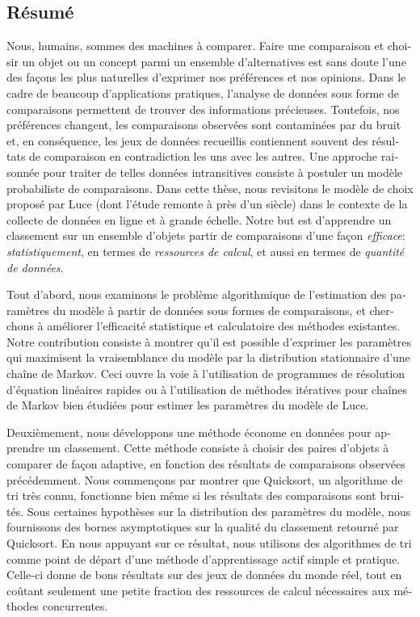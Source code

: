 \begin{otherlanguage}{french}
\chapter*{Résumé}

Nous, humains, sommes des machines à comparer.
Faire une comparaison et choisir un objet ou un concept parmi un ensemble d'alternatives est sans doute l'une des façons les plus naturelles d'exprimer nos préférences et nos opinions.
Dans le cadre de beaucoup d'applications pratiques, l'analyse de données sous forme de comparaisons permettent de trouver des informations précieuses.
Toutefois, nos préférences changent, les comparaisons observées sont contaminées par du bruit et, en conséquence, les jeux de données recueillis contiennent souvent des résultats de comparaison en contradiction les uns avec les autres.
Une approche raisonnée pour traiter de telles données intransitives consiste à postuler un modèle probabiliste de comparaisons.
Dans cette thèse, nous revisitons le modèle de choix proposé par Luce (dont l'étude remonte à près d'un siècle) dans le contexte de la collecte de données en ligne et à grande échelle.
Notre but est d'apprendre un classement sur un ensemble d'objets partir de comparaisons d'une façon \emph{efficace}: \emph{statistiquement}, en termes de \emph{ressources de calcul}, et aussi en termes de \emph{quantité de données}.

Tout d'abord, nous examinons le problème algorithmique de l'estimation des paramètres du modèle à partir de données sous formes de comparaisons, et cherchons à améliorer l'efficacité statistique et calculatoire des méthodes existantes.
Notre contribution consiste à montrer qu'il est possible d'exprimer les paramètres qui maximisent la vraisemblance du modèle par la distribution stationnaire d'une chaîne de Markov.
Ceci ouvre la voie à l'utilisation de programmes de résolution d'équation linéaires rapides ou à l'utilisation de méthodes itératives pour chaînes de Markov bien étudiées pour estimer les paramètres du modèle de Luce.

Deuxièmement, nous développons une méthode économe en données pour apprendre un classement.
Cette méthode consiste à choisir des paires d'objets à comparer de façon adaptive, en fonction des résultats de comparaisons observées précédemment.
Nous commençons par montrer que Quicksort, un algorithme de tri très connu, fonctionne bien même si les résultats des comparaisons sont bruités.
Sous certaines hypothèses sur la distribution des paramètres du modèle, nous fournissons des bornes asymptotiques sur la qualité du classement retourné par Quicksort.
En nous appuyant sur ce résultat, nous utilisons des algorithmes de tri comme point de départ d'une méthode d'apprentissage actif simple et pratique.
Celle-ci donne de bons résultats sur des jeux de données du monde réel, tout en coûtant seulement une petite fraction des ressources de calcul nécessaires aux méthodes concurrentes.


\end{otherlanguage}
